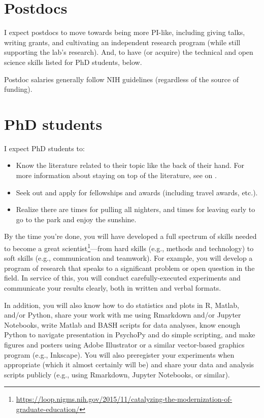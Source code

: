\documentclass[letterpaper,12pt,oneside]{memoir}
\begin{document}
\section{Postdocs}

I expect postdocs to move towards being more PI-like, including giving talks, writing grants, and cultivating an independent research program (while still supporting the lab's research). And, to have (or acquire) the technical and open science skills listed for PhD students, below.


Postdoc salaries generally follow NIH guidelines (regardless of the source of funding).

\section{PhD students}

I expect PhD students to:

\begin{itemize}
\item Know the literature related to their topic like the back of their hand. For more information about staying on top of the literature, see  on .
\item Seek out and apply for fellowships and awards (including travel awards, etc.).
\item Realize there are times for pulling all nighters, and times for leaving early to go to the park and enjoy the sunshine.
\end{itemize}

By the time you're done, you will have developed a full spectrum of skills needed to become a great scientist\footnote{\url{https://loop.nigms.nih.gov/2015/11/catalyzing-the-modernization-of-graduate-education/}}---from hard skills (e.g., methods and technology) to soft skills (e.g., communication and teamwork). For example, you will develop a program of research that speaks to a significant problem or open question in the field. In service of this, you will conduct carefully-executed experiments and communicate your results clearly, both in written and verbal formats. 

In addition, you will also know how to do statistics and plots in R, Matlab, and/or Python, share your work with me using Rmarkdown and/or Jupyter Notebooks, write Matlab and BASH scripts for data analyses, know enough Python to navigate presentation in PsychoPy and do simple scripting, and make figures and posters using Adobe Illustrator or a similar vector-based graphics program (e.g., Inkscape). You will also preregister your experiments when appropriate (which it almost certainly will be) and share your data and analysis scripts publicly (e.g., using Rmarkdown, Jupyter Notebooks, or similar). 
\end{document}
